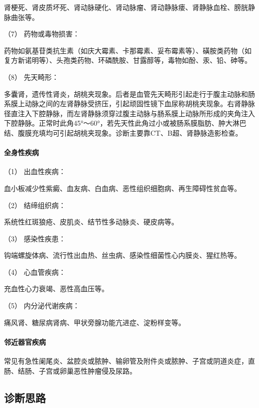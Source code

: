 肾梗死、肾皮质坏死、肾动脉硬化、肾动脉瘤、肾动静脉瘘、肾静脉血栓、膀胱静脉曲张等。

\hypertarget{text00037.htmlux5cux23CHP1-15-1-1-7}{}
（7） 药物或毒物损害：

药物如氨基苷类抗生素（如庆大霉素、卡那霉素、妥布霉素等）、磺胺类药物（如复方新诺明等）、头孢类药物、环磷酰胺、甘露醇等，毒物如酚、汞、铅、砷等。

\hypertarget{text00037.htmlux5cux23CHP1-15-1-1-8}{}
（8） 先天畸形：

多囊肾，遗传性肾炎，胡桃夹现象。后者是血管先天畸形引起走行于腹主动脉和肠系膜上动脉之间的左肾静脉受挤压，引起顽固性镜下血尿称胡桃夹现象。右肾静脉径直注入下腔静脉，而左肾静脉须穿过腹主动脉与肠系膜上动脉所形成的夹角注入下腔静脉。正常时此角45°～60°，若先天性此角过小或被肠系膜脂肪、肿大淋巴结、腹膜充填均可引起胡桃夹现象。诊断主要靠CT、B超、肾静脉造影检查。

\paragraph{全身性疾病}

\hypertarget{text00037.htmlux5cux23CHP1-15-1-2-1}{}
（1） 出血性疾病：

血小板减少性紫癜、血友病、白血病、恶性组织细胞病、再生障碍性贫血等。

\hypertarget{text00037.htmlux5cux23CHP1-15-1-2-2}{}
（2） 结缔组织病：

系统性红斑狼疮、皮肌炎、结节性多动脉炎、硬皮病等。

\hypertarget{text00037.htmlux5cux23CHP1-15-1-2-3}{}
（3） 感染性疾患：

钩端螺旋体病、流行性出血热、丝虫病、感染性细菌性心内膜炎、猩红热等。

\hypertarget{text00037.htmlux5cux23CHP1-15-1-2-4}{}
（4） 心血管疾病：

充血性心力衰竭、恶性高血压等。

\hypertarget{text00037.htmlux5cux23CHP1-15-1-2-5}{}
（5） 内分泌代谢疾病：

痛风肾、糖尿病肾病、甲状旁腺功能亢进症、淀粉样变等。

\paragraph{邻近器官疾病}

常见有急性阑尾炎、盆腔炎或脓肿、输卵管及附件炎或脓肿、子宫或阴道炎症，直肠、结肠、子宫或卵巢恶性肿瘤侵及尿路。

\subsection{诊断思路}

